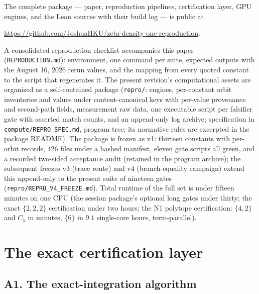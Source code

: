 \documentclass[11pt]{article}
\numberwithin{equation}{section}
\theoremstyle{definition}
\theoremstyle{remark}
\begin{document}
The complete package --- paper, reproduction pipelines,
certification layer, GPU engines, and the Lean sources with their
build log --- is public at\\
\centerline{\url{https://github.com/JoshuaHKU/zeta-density-one-reproduction}.}
A consolidated reproduction checklist accompanies this paper
(\texttt{REPRODUCTION.md}): environment, one command per suite,
expected outputs with the August 16, 2026 rerun values, and the
mapping from every quoted constant to the script that regenerates
it. The present revision's computational assets are organized
as a self-contained package (\texttt{repro/}: engines,
per-constant orbit inventories and values under
content-canonical keys with per-value provenance and
second-path fields, measurement raw data, one executable
script per falsifier gate with asserted match counts, and an
append-only log archive; specification in
\texttt{compute/REPRO\_SPEC.md}, program tree; its normative rules
are excerpted in the package README). The package is frozen as
v1: thirteen constants with per-orbit records, $126$ files
under a hashed manifest, eleven gate scripts all green, and a
recorded two-sided acceptance audit
(retained in the program archive); the subsequent freezes
v3 (trace route) and v4 (branch-equality campaign) extend
this append-only to the present suite of nineteen gates
(\texttt{repro/REPRO\_V4\_FREEZE.md}). Total runtime of the full set is under fifteen minutes on one
CPU (the session package's optional long gates under thirty; the
exact $\{2,2,2\}$ certification under two hours; the N1
polytope certification: $\{4,2\}$ and $C_5$ in minutes,
$\{6\}$ in $9.1$ single-core hours, term-parallel).

\section{The exact certification layer}\label{a:cert}

\subsection*{A1. The exact-integration algorithm}
\end{document}
